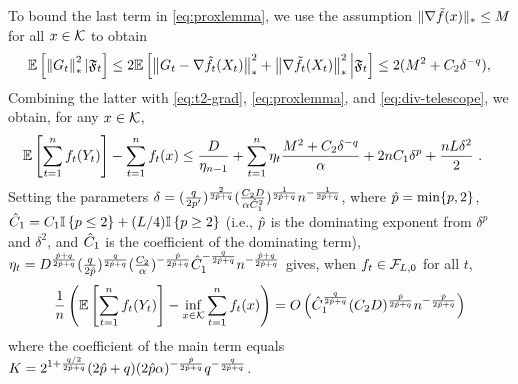To bound the last term in \eqref{eq:proxlemma}, we use the assumption $\|\nabla \tilde{f}(x)\|_* \le M$ for all $x \in \mathcal{K}$ to obtain
\begin{equation}
\label{eq:t2-g2}
\mathbb{E}\left[\left\|G_t\right\|_*^2 | \mathfrak{F}_t\right] \le 2\mathbb{E}\left[\left\|G_t - \nabla \tilde{f}_t(X_t)\right\|_*^2 + \left\|\nabla \tilde{f}_t(X_t)\right\|_*^2 \Big| \mathfrak{F}_t\right]
\le 2(M^2 + C_2 \delta^{-q}),
\end{equation}
Combining the latter with \eqref{eq:t2-grad}, \eqref{eq:proxlemma}, and \eqref{eq:div-telescope}, we obtain, for any $x \in \mathcal{K}$,
\begin{align}
\mathbb{E}\left[\sum_{t=1}^n f_t(Y_t)\right] - \sum_{t=1}^n f_t(x) 
& \le \frac{D}{\eta_{n-1}}  + \sum_{t=1}^n \eta_t \frac{M^2 + C_2 \delta^{-q}}{\alpha} +  2 n C_1 \delta^{p} + \frac{n L \delta^2}{2}~.
\label{eq:t2-full}
\end{align}
Setting the parameters 
$\delta=(\frac{q}{2p'})^{\frac{2}{2\hat{p}+q}} (\frac{C_2 D}{\alpha \hat{C}_1^2})^{\frac{1}{2\hat{p}+q}} n^{-\frac{1}{2\hat{p}+q}}$, 
where $\hat{p}=\min\{p,2\}$, $\hat{C}_1=C_1 \mathbb{I}\left\{p \le 2\right\} + (L/4) \mathbb{I}\left\{p \ge 2\right\}$ (i.e., $\hat{p}$ is the dominating exponent from $\delta^p$ and $\delta^2$, and $\hat{C}_1$ is the coefficient of the dominating term), $\eta_t=D^{\frac{\hat{p}+q}{2\hat{p}+q}} (\frac{q}{2\hat{p}})^{\frac{q}{2\hat{p}+q}} (\frac{C_2}{\alpha})^{-\frac{\hat{p}}{2\hat{p}+q}} \hat{C}_1^{-\frac{q}{2\hat{p}+q}} n^{-\frac{\hat{p}+q}{2\hat{p}+q}}$ gives, when $f_t \in \mathcal{F}_{L,0}$ for all $t$, 
\begin{equation}
\frac{1}{n}\left(\mathbb{E}\left[\sum_{t=1}^n f_t(Y_t)\right] - \inf_{x \in \mathcal{K}} \sum_{t=1}^n f_t(x) \right) = O\left( \hat{C}_1^{\frac{q}{2\hat{p}+q}} (C_2 D)^{\frac{\hat{p}}{2\hat{p}+q}} n^{-\frac{\hat{p}}{2\hat{p}+q}} \right)
\label{eq:t2-bound}
\end{equation}
where the coefficient of the main term equals $K=2^{1+\frac{q/2}{2\hat{p}+q}}(2\hat{p}+q) (2\hat{p} \alpha)^{-\frac{\hat{p}}{2\hat{p}+q}} q^{-\frac{q}{2\hat{p}+q}}$.

